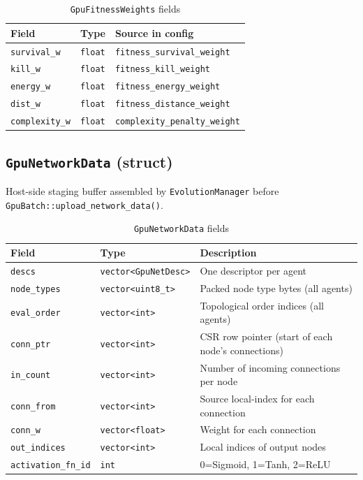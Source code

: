 \begin{table}[H]
\centering\small
\caption{\texttt{GpuFitnessWeights} fields}
\begin{tabular}{@{}lll@{}}
\toprule
\textbf{Field} & \textbf{Type} & \textbf{Source in config} \\
\midrule
\texttt{survival\_w}  & \texttt{float} & \texttt{fitness\_survival\_weight} \\
\texttt{kill\_w}      & \texttt{float} & \texttt{fitness\_kill\_weight} \\
\texttt{energy\_w}    & \texttt{float} & \texttt{fitness\_energy\_weight} \\
\texttt{dist\_w}      & \texttt{float} & \texttt{fitness\_distance\_weight} \\
\texttt{complexity\_w}& \texttt{float} & \texttt{complexity\_penalty\_weight} \\
\bottomrule
\end{tabular}
\end{table}

\subsection{\texttt{GpuNetworkData} (struct)}

Host-side staging buffer assembled by \texttt{EvolutionManager} before
\texttt{GpuBatch::upload\_network\_data()}.

\begin{table}[H]
\centering\small
\caption{\texttt{GpuNetworkData} fields}
\begin{tabularx}{\textwidth}{@{}llX@{}}
\toprule
\textbf{Field} & \textbf{Type} & \textbf{Description} \\
\midrule
\texttt{descs}           & \texttt{vector<GpuNetDesc>} & One descriptor per agent \\
\texttt{node\_types}     & \texttt{vector<uint8\_t>}   & Packed node type bytes (all agents) \\
\texttt{eval\_order}     & \texttt{vector<int>}        & Topological order indices (all agents) \\
\texttt{conn\_ptr}       & \texttt{vector<int>}        & CSR row pointer (start of each node's connections) \\
\texttt{in\_count}       & \texttt{vector<int>}        & Number of incoming connections per node \\
\texttt{conn\_from}      & \texttt{vector<int>}        & Source local-index for each connection \\
\texttt{conn\_w}         & \texttt{vector<float>}      & Weight for each connection \\
\texttt{out\_indices}    & \texttt{vector<int>}        & Local indices of output nodes \\
\texttt{activation\_fn\_id} & \texttt{int}             & 0=Sigmoid, 1=Tanh, 2=ReLU \\
\bottomrule
\end{tabularx}
\end{table}


